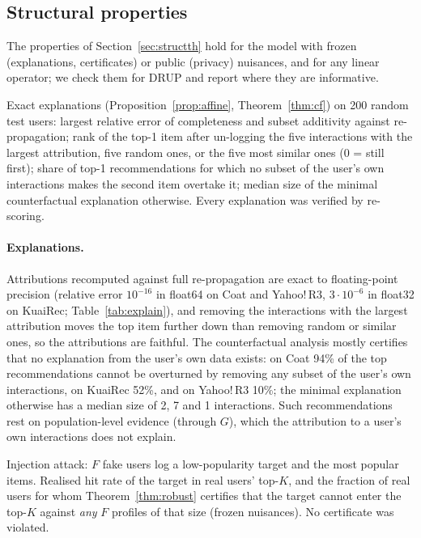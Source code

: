 \subsection{Structural properties}\label{sec:struct}

The properties of Section~\ref{sec:structth} hold for the model with frozen
(explanations, certificates) or public (privacy) nuisances, and for any linear
operator; we check them for DRUP and report where they are informative.

\begin{table}[t]\centering\small
\caption{Exact explanations (Proposition~\ref{prop:affine}, Theorem~\ref{thm:cf}) on 200 random
test users: largest relative error of completeness and subset additivity
against re-propagation; rank of the top-1 item after un-logging the five
interactions with the largest attribution, five random ones, or the five most
similar ones (0 = still first); share of top-1 recommendations for which no
subset of the user's own interactions makes the second item overtake it; median
size of the minimal counterfactual explanation otherwise. Every explanation
was verified by re-scoring.}\label{tab:explain}
\begin{adjustbox}{max width=\textwidth}

\end{adjustbox}
\end{table}

\paragraph{Explanations.} Attributions recomputed against full re-propagation
are exact to floating-point precision (relative error $10^{-16}$ in float64 on
Coat and Yahoo!\,R3, $3\cdot10^{-6}$ in float32 on KuaiRec; Table~\ref{tab:explain}), and removing the
interactions with the largest attribution moves the top item further down than
removing random or similar ones, so the attributions are faithful. The
counterfactual analysis mostly certifies that no explanation from the user's
own data exists: on Coat 94\% of the top recommendations cannot be overturned by removing any subset of the user's own interactions, on KuaiRec 52\%, and on Yahoo!\,R3 10\%; the minimal explanation otherwise has a median size of 2, 7 and 1 interactions. Such recommendations rest on population-level
evidence (through $G$), which the attribution to a user's own interactions does
not explain.

\begin{table}[t]\centering\small
\caption{Injection attack: $F$ fake users log a low-popularity target and the most
popular items. Realised hit rate of the target in real users' top-$K$, and the
fraction of real users for whom Theorem~\ref{thm:robust} certifies that the target
cannot enter the top-$K$ against \emph{any} $F$ profiles of that size (frozen
nuisances). No certificate was violated.}\label{tab:attack}
\begin{adjustbox}{max width=\textwidth}

\end{adjustbox}
\end{table}

